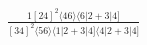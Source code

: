 \documentclass[varwidth, border=5pt]{standalone}
\begin{document}
\begin{my}
$\begin{gathered}
\scriptscriptstyle\frac{1[24]^2⟨46⟩⟨6|2+3|4]}{[34]^2⟨56⟩⟨1|2+3|4]⟨4|2+3|4]}
\end{gathered}$
\end{my}
\end{document}
